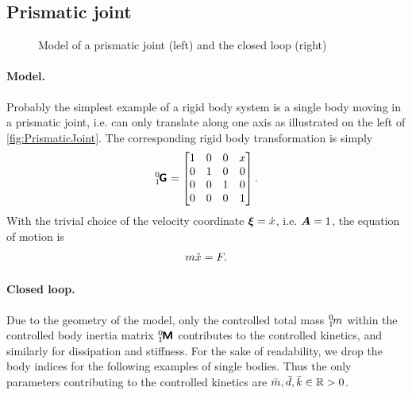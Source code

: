 \subsection{Prismatic joint}
\begin{figure}[h]
 \centering
 
 \caption{Model of a prismatic joint (left) and the closed loop (right)}
 \label{fig:PrismaticJoint}
\end{figure}

\paragraph{Model.}
Probably the simplest example of a rigid body system is a single body moving in a prismatic joint, i.e. can only translate along one axis as illustrated on the left of \autoref{fig:PrismaticJoint}.
The corresponding rigid body transformation is simply
\begin{align}
 \bodyHomoCoord{0}{1} = \begin{bmatrix} 1 & 0 & 0 & x \\ 0 & 1 & 0 & 0 \\ 0 & 0 & 1 & 0 \\ 0 & 0 & 0 & 1\end{bmatrix}.
\end{align}
With the trivial choice of the velocity coordinate $\boldsymbol{\xi} = \dot{x}$, i.e. $\boldsymbol{A} = 1$, the equation of motion is
\begin{align}
 m \ddot{x} = F.
\end{align}

\paragraph{Closed loop.}
Due to the geometry of the model, only the controlled total mass $\bodyMass{0}{1}$ within the controlled body inertia matrix $\bodyInertiaMat{0}{1}$ contributes to the controlled kinetics, and similarly for dissipation and stiffness.
For the sake of readability, we drop the body indices for the following examples of single bodies.
Thus the only parameters contributing to the controlled kinetics are $\bar{m}, \bar{d}, \bar{k} \in \mathbb{R} > 0$.

